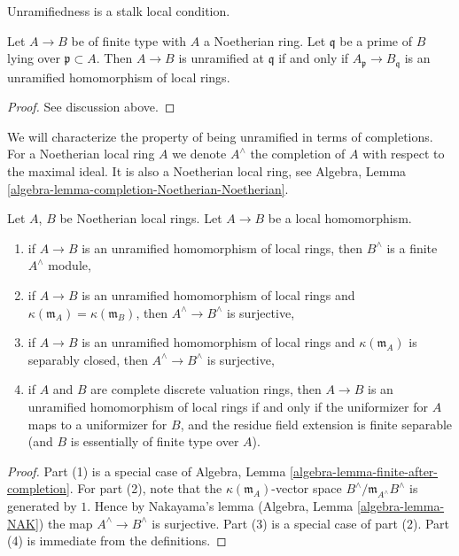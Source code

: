\begin{lemma}
\label{lemma-characterize-unramified-Noetherian}
\begin{slogan}
Unramifiedness is a stalk local condition.
\end{slogan}
Let $A \to B$ be of finite type with $A$ a Noetherian ring.
Let $\mathfrak q$ be a prime of $B$ lying over $\mathfrak p \subset A$.
Then $A \to B$ is unramified at $\mathfrak q$ if and only if
$A_{\mathfrak p} \to B_{\mathfrak q}$ is an unramified homomorphism
of local rings.
\end{lemma}

\begin{proof}
See discussion above.
\end{proof}

\noindent
We will characterize the property of being unramified in terms
of completions. For a Noetherian local ring $A$
we denote $A^\wedge$ the completion of $A$ with respect to the
maximal ideal. It is also a Noetherian local ring, see
Algebra, Lemma \ref{algebra-lemma-completion-Noetherian-Noetherian}.

\begin{lemma}
\label{lemma-unramified-completions}
Let $A$, $B$ be Noetherian local rings.
Let $A \to B$ be a local homomorphism.
\begin{enumerate}
\item if $A \to B$ is an unramified homomorphism of local rings,
then $B^\wedge$ is a finite $A^\wedge$ module,
\item if $A \to B$ is an unramified homomorphism of local rings and
$\kappa(\mathfrak m_A) = \kappa(\mathfrak m_B)$,
then $A^\wedge \to B^\wedge$ is surjective,
\item if $A \to B$ is an unramified homomorphism of local rings
and $\kappa(\mathfrak m_A)$
is separably closed, then $A^\wedge \to B^\wedge$ is surjective,
\item if $A$ and $B$ are complete discrete valuation rings, then
$A \to B$ is an unramified homomorphism of local rings
if and only if the uniformizer for $A$ maps to a uniformizer for $B$,
and the residue field extension is finite separable (and $B$ is
essentially of finite type over $A$).
\end{enumerate}
\end{lemma}

\begin{proof}
Part (1) is a special case of
Algebra, Lemma \ref{algebra-lemma-finite-after-completion}.
For part (2), note that the $\kappa(\mathfrak m_A)$-vector space
$B^\wedge/\mathfrak m_{A^\wedge}B^\wedge$
is generated by $1$. Hence by Nakayama's lemma
(Algebra, Lemma \ref{algebra-lemma-NAK}) the map
$A^\wedge \to B^\wedge$ is surjective.
Part (3) is a special case of part (2).
Part (4) is immediate from the definitions.
\end{proof}

